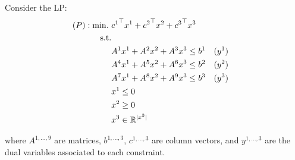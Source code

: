 \noindent Consider the LP:
\begin{align*}
	(P) : \mathop{\text{min.~}} &  {c^1}^\top x^1 + {c^2}^\top x^2 + {c^3}^\top x^3 & \\
	\text{s.t.} & \\ 
	 & {A}^1{x}^1 + {A}^2{x}^2 + {A}^3{x}^3 \leq b^1 \quad (y^1) \\
	 & {A}^4{x}^1 + {A}^5{x}^2 + {A}^6{x}^3 \leq b^2 \quad (y^2) \\	 
	 & {A}^7{x}^1 + {A}^8{x}^2 + {A}^9{x}^3 \leq b^3 \quad (y^3) \\
	 & x^1 \leq 0 \\
	 & x^2 \geq 0 \\
	 & x^3  \in \mathbb{R}^{|x^3|}
\end{align*}

\noindent where $A^{1,...,9}$ are matrices, $b^{1,...,3}$, $c^{1,...,3}$ are column vectors, and $y^{1,...,3}$ are the dual variables associated to each constraint. 

